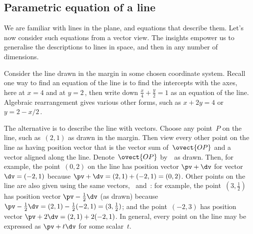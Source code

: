 \subsection{Parametric equation of a line}
\label{sec:pel}

We are familiar with lines in the plane, and equations that describe them. 
Let's now consider such equations from a vector view.
The insights empower us to generalise the descriptions to lines in space, and then in any number of dimensions.

\begin{example} \label{eg:}
Consider the line drawn in the margin in some chosen coordinate system.
%
Recall one way to find an equation of the line is to find the intercepts with the axes, here at \(x=4\) and at \(y=2\)\,, then write down \(\frac x4+\frac y2=1\) as an equation of the line.
Algebraic rearrangement gives various other forms, such as \(x+2y=4\) or \(y=2-x/2\)\,.

The alternative is to describe the line with vectors.
Choose any point~\(P\) on the line, such as~\((2,1)\) as drawn in the margin.
%
Then view every other point on the line as having position vector that is the vector sum of~\(\ovect{OP}\) and a vector aligned along the line.
Denote~\(\ovect{OP}\) by~\pv\ as drawn.
Then, for example, the point~\((0,2)\) on the line has position vector  \(\pv+\dv\) for vector \(\dv=(-2,1)\) because \(\pv+\dv=(2,1)+(-2,1)=(0,2)\).
Other points on the line are also given using the same vectors, \pv\ and~\dv: for example, the point~\((3,\tfrac12)\) has position vector \(\pv-\tfrac12\dv\) (as drawn) because \(\pv-\tfrac12\dv=(2,1)-\tfrac12(-2,1)=(3,\tfrac12)\); and the point~\((-2,3)\) has position vector \(\pv+2\dv=(2,1)+2(-2,1)\).
In general, every point on the line may be expressed as \(\pv+t\dv\) for some scalar~\(t\).


\end{example}
